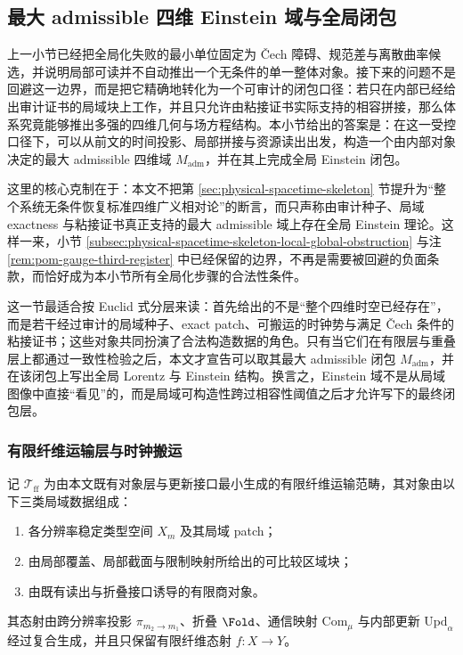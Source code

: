\subsection{最大 admissible 四维 Einstein 域与全局闭包}\label{subsec:physical-spacetime-skeleton-admissible-einstein-domain}

上一小节已经把全局化失败的最小单位固定为 \v{C}ech 障碍、规范差与离散曲率候选，并说明局部可读并不自动推出一个无条件的单一整体对象。接下来的问题不是回避这一边界，而是把它精确地转化为一个可审计的闭包口径：若只在内部已经给出审计证书的局域块上工作，并且只允许由粘接证书实际支持的相容拼接，那么体系究竟能够推出多强的四维几何与场方程结构。本小节给出的答案是：在这一受控口径下，可以从前文的时间投影、局部拼接与资源读出出发，构造一个由内部对象决定的最大 admissible 四维域 \(M_{\mathrm{adm}}\)，并在其上完成全局 Einstein 闭包。

这里的核心克制在于：本文不把第 \ref{sec:physical-spacetime-skeleton} 节提升为“整个系统无条件恢复标准四维广义相对论”的断言，而只声称由审计种子、局域 exactness 与粘接证书真正支持的最大 admissible 域上存在全局 Einstein 理论。这样一来，小节 \ref{subsec:physical-spacetime-skeleton-local-global-obstruction} 与注 \ref{rem:pom-gauge-third-register} 中已经保留的边界，不再是需要被回避的负面条款，而恰好成为本小节所有全局化步骤的合法性条件。

\begin{remark}\label{rem:physical-spacetime-admissible-einstein-threshold-reading}
这一节最适合按 Euclid 式分层来读：首先给出的不是“整个四维时空已经存在”，而是若干经过审计的局域种子、exact patch、可搬运的时钟势与满足 \v{C}ech 条件的粘接证书；这些对象共同扮演了合法构造数据的角色。只有当它们在有限层与重叠层上都通过一致性检验之后，本文才宣告可以取其最大 admissible 闭包 \(M_{\mathrm{adm}}\)，并在该闭包上写出全局 Lorentz 与 Einstein 结构。换言之，Einstein 域不是从局域图像中直接“看见”的，而是局域可构造性跨过相容性阈值之后才允许写下的最终闭包层。
\end{remark}

\subsubsection{有限纤维运输层与时钟搬运}

\begin{definition}[有限纤维运输范畴]\label{def:physical-spacetime-finite-fiber-transport}
记 \(\mathcal T_{\mathrm{ff}}\) 为由本文既有对象层与更新接口最小生成的有限纤维运输范畴，其对象由以下三类局域数据组成：
\begin{enumerate}
  \item 各分辨率稳定类型空间 \(X_m\) 及其局域 patch；
  \item 由局部覆盖、局部截面与限制映射所给出的可比较区域块；
  \item 由既有读出与折叠接口诱导的有限商对象。
\end{enumerate}
其态射由跨分辨率投影 \(\pi_{m_2\to m_1}\)、折叠 \(\Fold\)、通信映射 \(\mathrm{Com}_\mu\) 与内部更新 \(\mathrm{Upd}_\alpha\) 经过复合生成，并且只保留有限纤维态射 \(f:X\to Y\)。
\end{definition}

